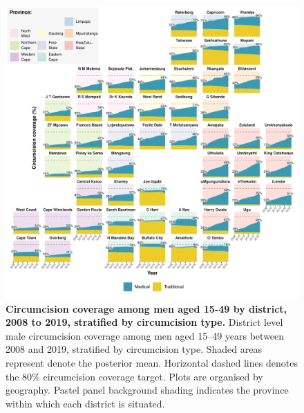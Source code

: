 \documentclass{article}
\begin{document}
\begin{figure}[H]
  \centering
  \includegraphics[width = \linewidth]{Figures/paper/Figure6.pdf}
  \caption{{\bf Circumcision coverage among men aged 15-49 by district, 2008 to 2019, stratified by circumcision type.} District level male circumcision coverage among men aged 15--49 years between 2008 and 2019, stratified by circumcision type. Shaded areas represent denote the posterior mean. Horizontal dashed lines denotes the 80\% circumcision coverage target. Plots are organised by geography. Pastel panel background shading indicates the province within which each district is situated.}
  \label{fig::district1549prev}
\end{figure}

\end{document}
